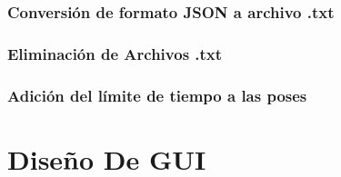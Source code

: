 \subsubsection{Conversión de formato JSON a archivo .txt}

\subsubsection{Eliminación de Archivos .txt}

\subsubsection{Adición del límite de tiempo a las poses}


\section{Diseño De GUI}

